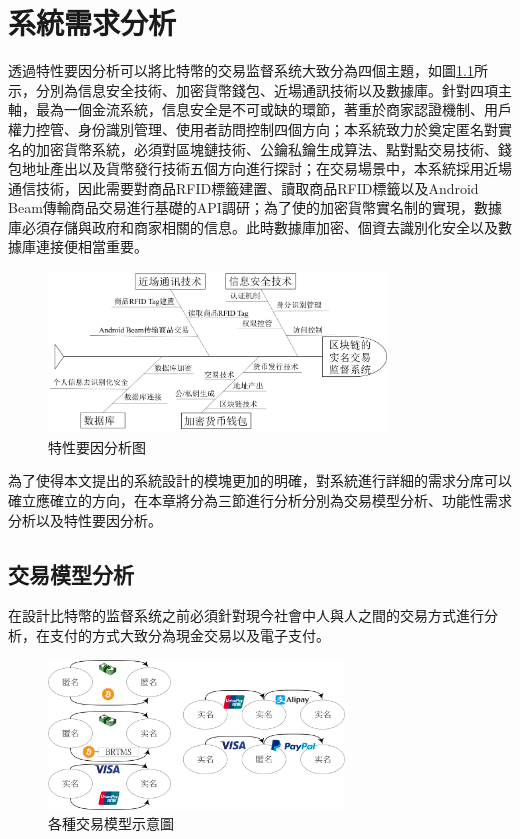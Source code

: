 \chapter{系統需求分析}

透過特性要因分析可以將比特幣的交易监督系统大致分為四個主題，如圖\ref{fish1}所示，分別為信息安全技術、加密貨幣錢包、近場通訊技術以及數據庫。針對四項主軸，最為一個金流系統，信息安全是不可或缺的環節，著重於商家認證機制、用戶權力控管、身份識別管理、使用者訪問控制四個方向；本系統致力於奠定匿名對實名的加密貨幣系統，必須對區塊鏈技術、公鑰私鑰生成算法、點對點交易技術、錢包地址產出以及貨幣發行技術五個方向進行探討；在交易場景中，本系統採用近場通信技術，因此需要對商品RFID標籤建置、讀取商品RFID標籤以及Android Beam傳輸商品交易進行基礎的API調研；為了使的加密貨幣實名制的實現，數據庫必須存儲與政府和商家相關的信息。此時數據庫加密、個資去識別化安全以及數據庫連接便相當重要。
		\begin{figure}[!htbp]
			\centering
			\includegraphics[width = 0.8\textwidth]{fish1.png}
			\caption{特性要因分析图}\label{fish1}
		\end{figure}

為了使得本文提出的系統設計的模塊更加的明確，對系統進行詳細的需求分席可以確立應確立的方向，在本章將分為三節進行分析分別為交易模型分析、功能性需求分析以及特性要因分析。


\section{交易模型分析}

在設計比特幣的监督系统之前必須針對現今社會中人與人之間的交易方式進行分析，在支付的方式大致分為現金交易以及電子支付。
\begin{figure}[!htbp]
	\centering
	\includegraphics[width = 0.7\textwidth]{modeall.png}
	\caption{各種交易模型示意圖}\label{modeall}
\end{figure}

